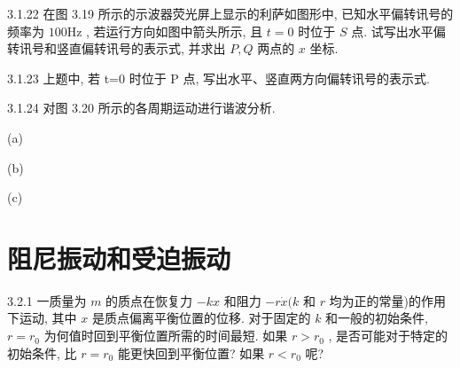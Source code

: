 \begin{problem}{3.1.22}
在图 3.19 所示的示波器荧光屏上显示的利萨如图形中, 已知水平偏转讯号的频率为 $100\mathrm{Hz}$ , 若运行方向如图中箭头所示, 且 $t = 0$ 时位于 $S$ 点. 试写出水平偏转讯号和竖直偏转讯号的表示式, 并求出 $P, Q$ 两点的 $x$ 坐标.
\begin{center}

\end{center}
\end{problem}
\clearpage


\begin{problem}{3.1.23}
上题中, 若 t=0 时位于 P 点, 写出水平、竖直两方向偏转讯号的表示式.
\end{problem}
\clearpage


\begin{problem}{3.1.24}
对图 3.20 所示的各周期运动进行谐波分析.

(a)

(b)

(c)
\begin{center}

\end{center}
\begin{center}

\end{center}
\begin{center}

\end{center}
\end{problem}
\clearpage


\section{阻尼振动和受迫振动}

\begin{problem}{3.2.1}
一质量为 $m$ 的质点在恢复力 $-kx$ 和阻力 $-r\dot{x}(k$ 和 $r$ 均为正的常量)的作用下运动, 其中 $x$ 是质点偏离平衡位置的位移. 对于固定的 $k$ 和一般的初始条件, $r = r_0$ 为何值时回到平衡位置所需的时间最短. 如果 $r > r_0$ , 是否可能对于特定的初始条件, 比 $r = r_0$ 能更快回到平衡位置? 如果 $r < r_0$ 呢?
\end{problem}
\clearpage


